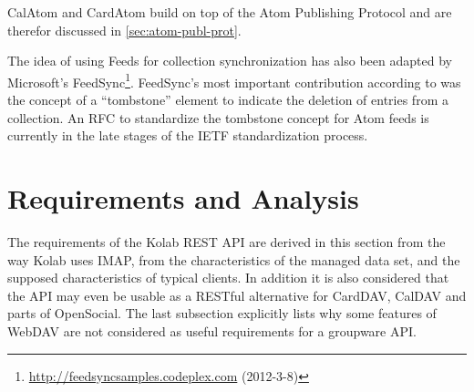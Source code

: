 \documentclass[11pt,a4paper,headsepline,twoside]{scrartcl}		%
\newcommand{\citeurl}[2]{\url{#1} (#2)}
\begin{document}
CalAtom and CardAtom build on top of the Atom Publishing Protocol and are
therefor discussed in \autoref{sec:atom-publ-prot}.

The idea of using Feeds for collection synchronization has also been adapted by
Microsoft's
FeedSync\footnote{\citeurl{http://feedsyncsamples.codeplex.com}{2012-3-8}}. FeedSync's
most important contribution according to \cite{Snell2007} was the concept of a
``tombstone'' element to indicate the deletion of entries from a collection. An
RFC to standardize the tombstone concept \cite{draft-snell-atompub-tombstones-14}
for Atom feeds is currently in the late stages of the IETF standardization
process.

\section{Requirements and Analysis}
\label{sec:requ-analys}

The requirements of the Kolab REST API are derived in this section from the way
Kolab uses IMAP, from the characteristics of the managed data set, and the
supposed characteristics of typical clients. In addition it is also considered
that the API may even be usable as a RESTful alternative for CardDAV, CalDAV and
parts of OpenSocial. The last subsection explicitly lists why some features of
WebDAV are not considered as useful requirements for a groupware API.



\end{document}
